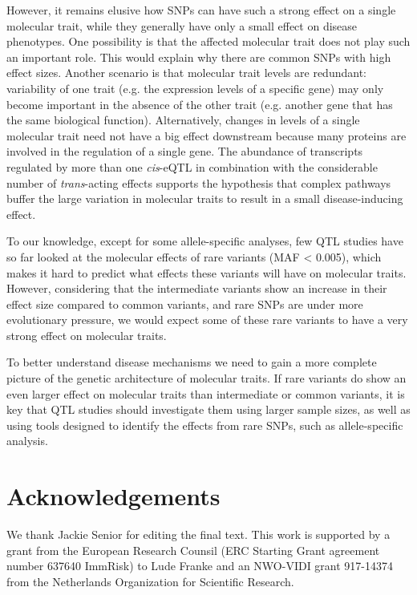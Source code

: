 However, it remains elusive how SNPs can have such a strong effect on a single molecular trait, while they generally have only a small effect on disease phenotypes. One possibility is that the affected molecular trait does not play such an important role. This would explain why there are common SNPs with high effect sizes. Another scenario is that molecular trait levels are redundant: variability of one trait (e.g. the expression levels of a specific gene) may only become important in the absence of the other trait (e.g. another gene that has the same biological function). Alternatively, changes in levels of a single molecular trait need not have a big effect downstream because many proteins are involved in the regulation of a single gene. The abundance of transcripts regulated by more than one \emph{cis}-eQTL in combination with the considerable number of \emph{trans}-acting effects supports the hypothesis that complex pathways buffer the large variation in molecular traits to result in a small disease-inducing effect.

To our knowledge, except for some allele-specific analyses, few QTL studies have so far looked at the molecular effects of rare variants (MAF < 0.005), which makes it hard to predict what effects these variants will have on molecular traits. However, considering that the intermediate variants show an increase in their effect size compared to common variants, and rare SNPs are under more evolutionary pressure, we would expect some of these rare variants to have a very strong effect on molecular traits.

To better understand disease mechanisms we need to gain a more complete picture of the genetic architecture of molecular traits. If rare variants do show an even larger effect on molecular traits than intermediate or common variants, it is key that QTL studies should investigate them using larger sample sizes, as well as using tools designed to identify the effects from rare SNPs, such as allele-specific analysis. 


\section*{Acknowledgements}
We thank Jackie Senior for editing the final text. This work is supported by a grant from the European Research Counsil (ERC Starting Grant agreement number 637640 ImmRisk) to Lude Franke and an NWO-VIDI grant 917-14374 from the Netherlands Organization for Scientific Research. 


